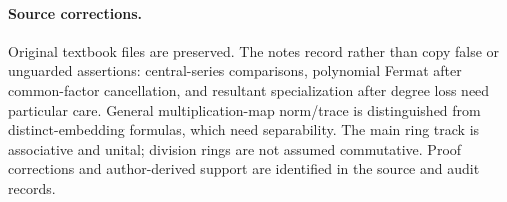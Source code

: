 \paragraph{Source corrections.}
Original textbook files are preserved. The notes record rather than copy
false or unguarded assertions: central-series comparisons, polynomial
Fermat after common-factor cancellation, and resultant specialization
after degree loss need particular care. General multiplication-map
norm/trace is distinguished from distinct-embedding formulas, which need
separability. The main ring track is associative and unital; division
rings are not assumed commutative. Proof corrections and author-derived
support are identified in the source and audit records.
